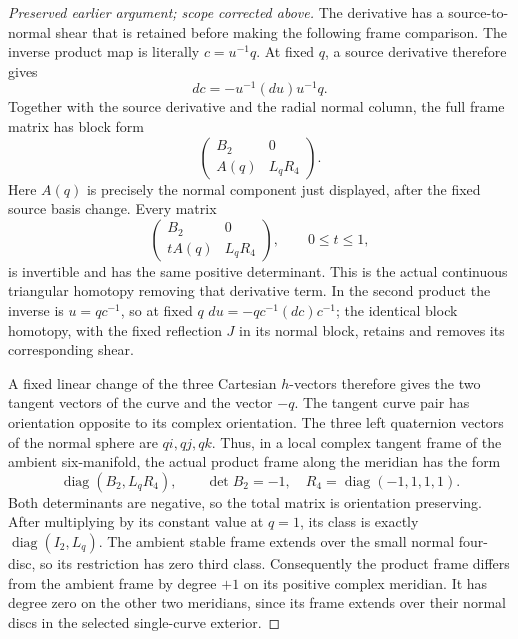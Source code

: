 \begin{proof}[Preserved earlier argument; scope corrected above]
The derivative has a source-to-normal shear that is
retained before making the following frame comparison.
The inverse product map is literally \(c=u^{-1}q\).
At fixed \(q\), a source derivative therefore gives
\[
                   dc=-u^{-1}(du)u^{-1}q.
\]
Together with the source derivative and the radial
normal column, the full frame matrix has block form
\[
       \begin{pmatrix}
         B_2&0\\ A(q)&L_qR_4
       \end{pmatrix}.
\]
Here \(A(q)\) is precisely the normal component just
displayed, after the fixed source basis change.
Every matrix
\[
       \begin{pmatrix}
         B_2&0\\ tA(q)&L_qR_4
       \end{pmatrix},\qquad 0\le t\le1,
\]
is invertible and has the same positive determinant.
This is the actual continuous triangular homotopy
removing that derivative term. In the second product
the inverse is \(u=qc^{-1}\), so at fixed \(q\)
\(du=-qc^{-1}(dc)c^{-1}\); the identical block homotopy,
with the fixed reflection \(J\) in its normal block,
retains and removes its corresponding shear.

A fixed linear change of the three Cartesian \(h\)-vectors
therefore gives the two tangent vectors of the curve and
the vector \(-q\). The tangent curve pair has orientation
opposite to its complex orientation. The three left
quaternion vectors of the normal sphere are \(qi,qj,qk\).
Thus, in a local complex tangent frame of the ambient
six-manifold, the actual product frame along the meridian
has the form
\[
       \operatorname{diag}(B_2,L_q R_4),\qquad
       \det B_2=-1,\quad
       R_4=\operatorname{diag}(-1,1,1,1).
                                                        \tag{P3K.31.4}
\]
Both determinants are negative, so the total matrix is
orientation preserving. After multiplying by its constant
value at \(q=1\), its class is exactly
\(\operatorname{diag}(I_2,L_q)\).
The ambient stable frame extends over the small normal
four-disc, so its restriction has zero third class.
Consequently the product frame differs from the ambient
frame by degree \(+1\) on its positive complex meridian.
It has degree zero on the other two meridians, since its
frame extends over their normal discs in the selected
single-curve exterior.


\end{proof}
